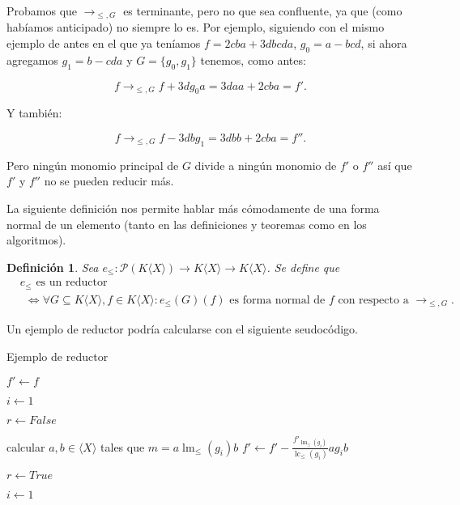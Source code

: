 \documentclass[12pt]{report}
\theoremstyle{customstyle}
\newtheorem{definition}[theorem]{Definición}
\theoremstyle{factstyle}
\DeclareMathOperator{\sop}{sop}
\DeclareMathOperator{\lm}{lm}
\DeclareMathOperator{\lc}{lc}
\begin{document}
Probamos que $→_{≤, G}$ es terminante, pero no que sea confluente, ya que (como habíamos anticipado) no siempre lo es. Por ejemplo, siguiendo con el mismo ejemplo de antes en el que ya teníamos $f = 2 cba + 3 dbcda$, $g_0 = a - bcd$, si ahora agregamos $g_1 = b - cda$ y $G = \{g_0, g_1\}$ tenemos, como antes:

\[f →_{≤, G} f + 3d g_0 a = 3 daa + 2 cba = f' \text{.}\]

\noindent Y también:

\[f →_{≤, G} f - 3db g_1 = 3 dbb + 2 cba = f'' \text{.}\]

\noindent Pero ningún monomio principal de $G$ divide a ningún monomio de $f'$ o $f''$ así que $f'$ y $f''$ no se pueden reducir más.

La siguiente definición nos permite hablar más cómodamente de una forma normal de un elemento (tanto en las definiciones y teoremas como en los algoritmos).

\begin{definition}\label{def:reductor}
  Sea $e_≤ : 𝒫(K⟨X⟩) → K⟨X⟩ → K⟨X⟩$. Se define que
  \begin{align*}
    & e_≤\text{ es un reductor }\\
    &\ \ ⇔ ∀G ⊆ K⟨X⟩, f ∈ K⟨X⟩ : e_≤(G)(f)\text{ es forma normal de }f\text{ con respecto a }→_{≤, G} \text{.}
  \end{align*} %
\end{definition}

Un ejemplo de reductor podría calcularse con el siguiente seudocódigo.

\begin{algorithm}[H] %
  \caption{Ejemplo de reductor}\label{alg:reductor}
  $f' ← f$

  $i ← 1$

   {
    $r ← False$

    \For{$m ∈ \sop(f')$} {
      \If{$\lm_≤(g_i) | m$} {
        calcular $a, b ∈ ⟨X⟩$ tales que $m = a \lm_≤(g_i) b$
        $f' ← f' - \frac{f'_{\lm_≤(g_i)}}{\lc_≤(g_i)}a g_i b$

        $r ← True$

        \Break
      }
    }

     {
      $i ← 1$
    } 
  }
\end{algorithm}
\end{document}
